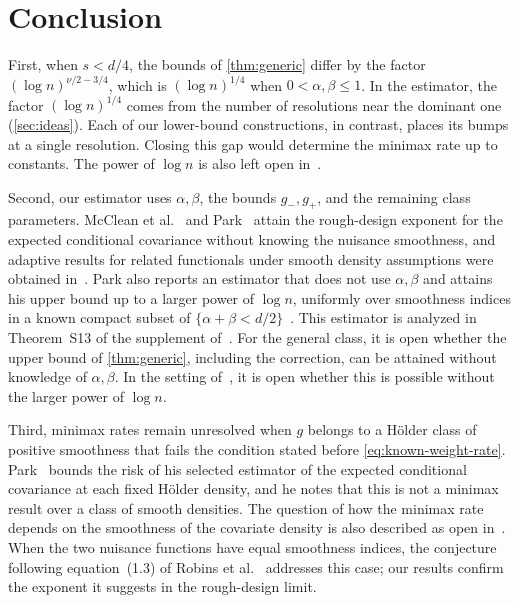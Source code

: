 \chapter{Conclusion}\label{sec:conclusion}

First, when $s<d/4$, the bounds of \cref{thm:generic} differ by the
factor $(\log n)^{\nu/2-3/4}$, which is $(\log n)^{1/4}$ when
$0<\alpha,\beta\le1$. In the estimator, the factor $(\log n)^{1/4}$
comes from the number of resolutions near the dominant one
(\cref{sec:ideas}). Each of our lower-bound constructions, in
contrast, places its bumps at a single resolution. Closing this gap
would determine the minimax rate up to constants. The power of
$\log n$ is also left open in~\cite{park}.

Second, our estimator uses $\alpha,\beta$, the bounds $g_-,g_+$, and
the remaining class parameters. McClean et al.~\cite{mcclean} and
Park~\cite[Corollary~1]{park} attain the rough-design exponent for the
expected conditional covariance without knowing the nuisance
smoothness, and adaptive results for related functionals under smooth
density assumptions were obtained in~\cite{adaptive}. Park also
reports an estimator that does not use
$\alpha,\beta$ and attains his upper bound up to a larger power of
$\log n$, uniformly over smoothness indices in a known compact subset
of $\{\alpha+\beta<d/2\}$~\cite[Section~3.4]{park}. This estimator is
analyzed in Theorem~S13 of the supplement of~\cite{park}. For the
general class, it is open whether the upper bound of
\cref{thm:generic}, including the correction, can be attained without
knowledge of $\alpha,\beta$. In the setting of~\cite{park}, it is
open whether this is possible without the larger power of $\log n$.

Third, minimax rates remain unresolved when $g$ belongs to a H\"older
class of positive smoothness that fails the condition stated before
\eqref{eq:known-weight-rate}. Park~\cite[Section~6.2]{park} bounds the
risk of his selected estimator of the expected conditional covariance
at each fixed H\"older density, and he notes that this is not a minimax
result over a class of smooth densities.
The question of how the minimax rate
depends on the smoothness of the covariate density is also described as
open in~\cite[Remark~5]{generalhoif}. When the two nuisance functions
have equal smoothness indices, the conjecture following equation~(1.3)
of Robins et al.~\cite{hoif2008} addresses this case; our results
confirm the exponent it suggests in the rough-design limit.
\appendix
